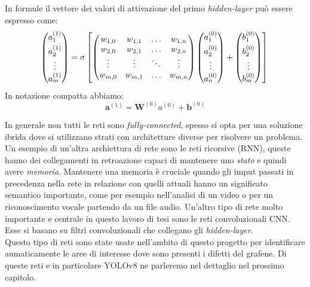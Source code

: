 \documentclass[12pt,a4paper,openright,twoside]{report}
\begin{document}
\newpage
In formule il vettore dei valori di attivazione del primo \emph{hidden-layer} può essere espresso come:
    \begin{equation} 
     \begin{pmatrix}
        a_{1}^{(1)} \\[0.3em]
        a_{2}^{(1)} \\
        \vdots \\
        a_{m}^{(1)}
      \end{pmatrix}
    =
      \sigma \left[ 
      \begin{pmatrix}
        w_{1,0} & w_{1,1} & \ldots & w_{1,n} \\
        w_{2,0} & w_{2,1} & \ldots & w_{2,n} \\
        \vdots  & \vdots  & \ddots & \vdots  \\
        w_{m,0} & w_{m,1} & \ldots & w_{m,n}
      \end{pmatrix}
      {
      \begin{pmatrix}
        a_{1}^{(0)} \\[0.3em]
        a_{2}^{(0)} \\
        \vdots \\
        a_{n}^{(0)}
      \end{pmatrix}}
      +
      \begin{pmatrix}
        b_{1}^{(0)} \\[0.3em]
        b_{2}^{(0)} \\
        \vdots \\
        b_{m}^{(0)}
      \end{pmatrix}\right] 

      \\
    \end{equation}
In notazione compatta abbiamo: 
    \begin{equation}
        \mathbf{a}^{(1)} = \mathbf{W}^{(0)} {a^{(0)}}+\mathbf{b}^{(0)}
    \end{equation}

In generale non tutti le reti sono \emph{fully-connected}, spesso si opta per una soluzione ibrida dove si utilizzano strati con architetture diverse per risolvere un problema. 
Un esempio di un'altra archiettura di rete sono le reti ricorsive (RNN), queste hanno dei collegamenti in retroazione capaci di mantenere uno \emph{stato} e quindi avere \emph{memoria}. Mantenere una memoria è cruciale quando gli imput passati in precedenza nella rete in relazione con quelli attuali hanno un significato semantico importante, come per esempio nell'analisi di un video o per un riconoscimento vocale partendo da un file audio.
Un'altro tipo di rete molto importante e centrale in questo lavoro di tesi sono le reti convoluzionali CNN. Esse si basano su filtri convoluzionali che collegano gli \emph{hidden-layer}.\\
Questo tipo di reti sono state usate nell'ambito di questo progetto per identificare aumaticamente le aree di interesse dove sono presenti i difetti del grafene. Di queste reti e in particolare YOLOv8 ne parleremo nel dettaglio nel prossimo capitolo.
\end{document}

